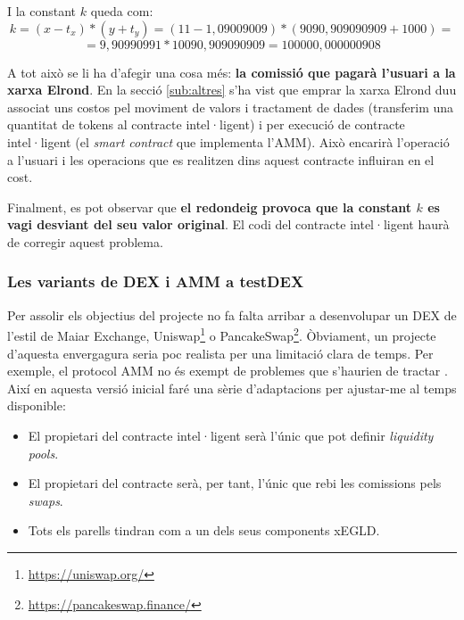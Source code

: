 \documentclass[11pt,a4paper]{article}
\begin{document}
I la constant \(k\) queda com:
\[k = (x - t_x) * (y + t_y) = (11 - 1,09009009) * (9090,909090909  + 1000) =\]
\[= 9,90990991 * 10090,909090909 = 100000,000000908\]

A tot això se li ha d'afegir una cosa més: \textbf{la comissió que pagarà l'usuari a la xarxa Elrond}. En la secció \ref{sub:altres} s'ha vist que emprar la xarxa Elrond duu associat uns costos pel moviment de valors i tractament de dades (transferim una quantitat de tokens al contracte intel·ligent) i per execució de contracte intel·ligent (el \textit{smart contract} que implementa l'AMM). Això encarirà l'operació a l'usuari i les operacions que es realitzen dins aquest contracte influiran en el cost.

Finalment, es pot observar que \textbf{el redondeig provoca que la constant \(k\) es vagi desviant del seu valor original}. El codi del contracte intel·ligent haurà de corregir aquest problema.

\subsubsection{Les variants de DEX i AMM a testDEX}
Per assolir els objectius del projecte no fa falta arribar a desenvolupar un DEX de l'estil de Maiar Exchange, Uniswap\footnote{\url{https://uniswap.org/}} o PancakeSwap\footnote{\url{https://pancakeswap.finance/}}. Òbviament, un projecte d'aquesta envergagura seria poc realista per una limitació clara de temps. Per exemple, el protocol AMM no és exempt de problemes que s'haurien de tractar \cite{vuterin2018}. Així en aquesta versió inicial faré una sèrie d'adaptacions per ajustar-me al temps disponible:
\begin{itemize}
\item El propietari del contracte intel·ligent serà l'únic que pot definir \textit{liquidity pools}.
\item El propietari del contracte serà, per tant, l'únic que rebi les comissions pels \textit{swaps}.
\item Tots els parells tindran com a un dels seus components xEGLD.
\end{itemize}
\end{document}
